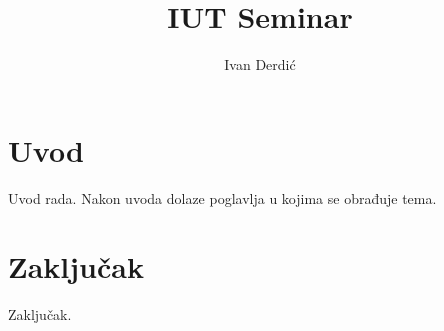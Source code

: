 \documentclass[times, utf8, seminar, numeric]{fer}
\begin{document}
\title{IUT Seminar}

\author{Ivan Derdić}

\maketitle

\tableofcontents

\chapter{Uvod}
Uvod rada. Nakon uvoda dolaze poglavlja u kojima se obrađuje tema.







\chapter{Zaključak}
Zaključak.



\end{document}
